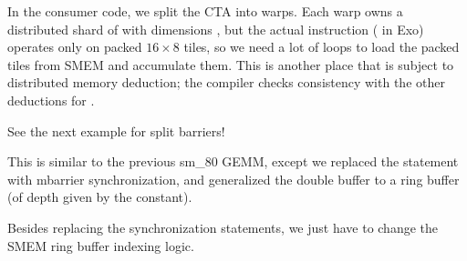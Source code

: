 

\newpage
{}

In the consumer code, we split the CTA into warps.
Each warp owns a distributed shard of  with dimensions \lighttt{[Mw/16, Nw/8, 16, 8]}, but the actual  instruction ( in Exo) operates only on packed $16 \times 8$ tiles, so we need a lot of  loops to load the packed tiles from SMEM and accumulate them.
This is another place that  is subject to distributed memory deduction; the compiler checks consistency with the other deductions for .



See the next example for split barriers!

\newpage
{}

This is similar to the previous sm\_80 GEMM, except we replaced the  statement with mbarrier synchronization, and generalized the double buffer to a ring buffer (of depth given by the  constant).



\newpage
{}

Besides replacing the synchronization statements, we just have to change the SMEM ring buffer indexing logic.




